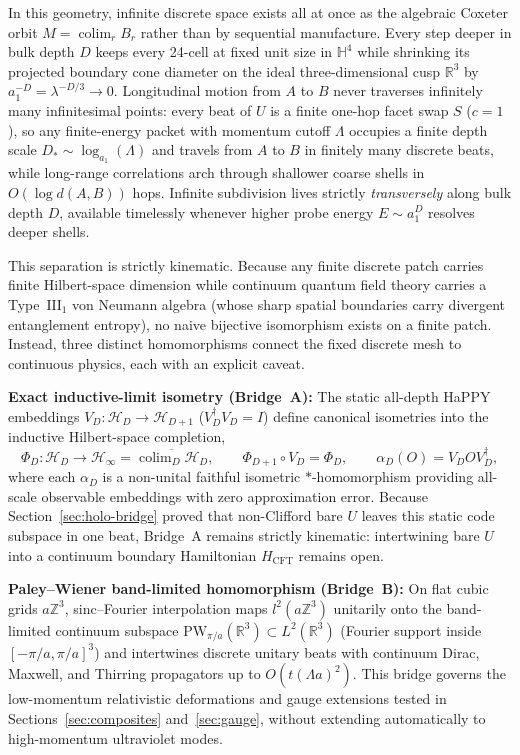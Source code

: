 In this geometry, infinite discrete space exists all at once as the algebraic Coxeter orbit $M = \operatorname{colim}_r
B_r$ rather than by sequential manufacture. Every step deeper in bulk depth $D$ keeps every 24-cell at fixed unit size
in $\mathbb{H}^4$ while shrinking its projected boundary cone diameter on the ideal three-dimensional cusp $\mathbb{R}^3$
by $a_1^{-D} = \lambda^{-D/3} \to 0$. Longitudinal motion from $A$ to $B$ never traverses infinitely many infinitesimal
points: every beat of $U$ is a finite one-hop facet swap $S$ ($c = 1$), so any finite-energy packet with momentum cutoff
$\Lambda$ occupies a finite depth scale $D_* \sim \log_{a_1}(\Lambda)$ and travels from $A$ to $B$ in finitely many
discrete beats, while long-range correlations arch through shallower coarse shells in $O(\log d(A, B))$ hops. Infinite
subdivision lives strictly \emph{transversely} along bulk depth $D$, available timelessly whenever higher probe energy
$E \sim a_1^D$ resolves deeper shells.

This separation is strictly kinematic. Because any finite discrete patch carries finite Hilbert-space dimension while
continuum quantum field theory carries a Type~$\mathrm{III}_1$ von Neumann algebra (whose sharp spatial boundaries carry
divergent entanglement entropy), no naive bijective isomorphism exists on a finite patch. Instead, three distinct
homomorphisms connect the fixed discrete mesh to continuous physics, each with an explicit caveat.

\textbf{Exact inductive-limit isometry (Bridge~A):} The static all-depth HaPPY embeddings
$V_D : \mathcal{H}_D \to \mathcal{H}_{D+1}$ ($V_D^\dagger V_D = I$) define canonical isometries into the inductive
Hilbert-space completion,
\begin{equation}
\Phi_D : \mathcal{H}_D \to \mathcal{H}_\infty = \overline{\operatorname{colim}_D \mathcal{H}_D},
\qquad
\Phi_{D+1} \circ V_D = \Phi_D,
\qquad
\alpha_D(O) = V_D O V_D^\dagger,
\label{eq:colimit-bridge}
\end{equation}
where each $\alpha_D$ is a non-unital faithful isometric $*$-homomorphism providing all-scale observable embeddings with
zero approximation error. Because Section~\ref{sec:holo-bridge} proved that non-Clifford bare $U$ leaves this static code
subspace in one beat, Bridge~A remains strictly kinematic: intertwining bare $U$ into a continuum boundary Hamiltonian
$H_{\mathrm{CFT}}$ remains open.

\textbf{Paley--Wiener band-limited homomorphism (Bridge~B):} On flat cubic grids $a\mathbb{Z}^3$, sinc--Fourier
interpolation maps $l^2(a\mathbb{Z}^3)$ unitarily onto the band-limited continuum subspace
$\mathrm{PW}_{\pi/a}(\mathbb{R}^3) \subset L^2(\mathbb{R}^3)$ (Fourier support inside $[-\pi/a, \pi/a]^3$) and
intertwines discrete unitary beats with continuum Dirac, Maxwell, and Thirring propagators up to $O(t(\Lambda a)^2)$.
This bridge governs the low-momentum relativistic deformations and gauge extensions tested in
Sections~\ref{sec:composites} and~\ref{sec:gauge}, without extending automatically to high-momentum ultraviolet modes.

